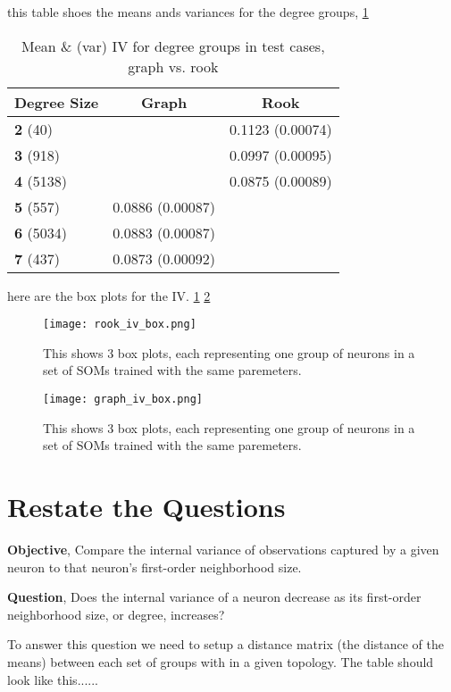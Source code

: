 this table shoes the means ands variances for the degree groups, \ref{meanvar1}


\begin{table}
\caption{Mean \& (var) IV for degree groups in test cases, graph vs. rook}
\label{meanvar1}
\begin{tabular}{|l|c|c|}
\hline
\textbf{Degree Size} & \textbf{Graph} & \textbf{Rook} \\
\hline
\textbf{2}   (40) & & 0.1123 (0.00074)  \\
\textbf{3}  (918) & & 0.0997 (0.00095)  \\
\textbf{4} (5138) & & 0.0875 (0.00089)  \\
\textbf{5}  (557) &   0.0886 (0.00087) &\\
\textbf{6} (5034) &   0.0883 (0.00087) &\\
\textbf{7}  (437) &   0.0873 (0.00092) &\\
\hline
\end{tabular} \end{table}



here are the box plots for the IV. \ref{fRookIV} \ref{fGraphIV}


\begin{figure}
\centering
\texttt{[image: rook\_iv\_box.png]}
\caption{This shows 3 box plots, each representing one group of neurons in a set
of SOMs trained with the same paremeters.}
\label{fRookIV}
\end{figure}

\begin{figure}
\centering
\texttt{[image: graph\_iv\_box.png]}
\caption{This shows 3 box plots, each representing one group of neurons in a set
of SOMs trained with the same paremeters.}
\label{fGraphIV}
\end{figure}



\section{Restate the Questions}
\textbf{Objective}, Compare the internal variance of observations captured by a given
neuron to that neuron's first-order neighborhood size.

\textbf{Question}, Does the internal variance of a neuron decrease as its first-order
neighborhood size, or degree, increases?


To answer this question we need to setup a distance matrix (the distance of the
means) between each set of groups with in a given topology.  The table should
look like this...... 

